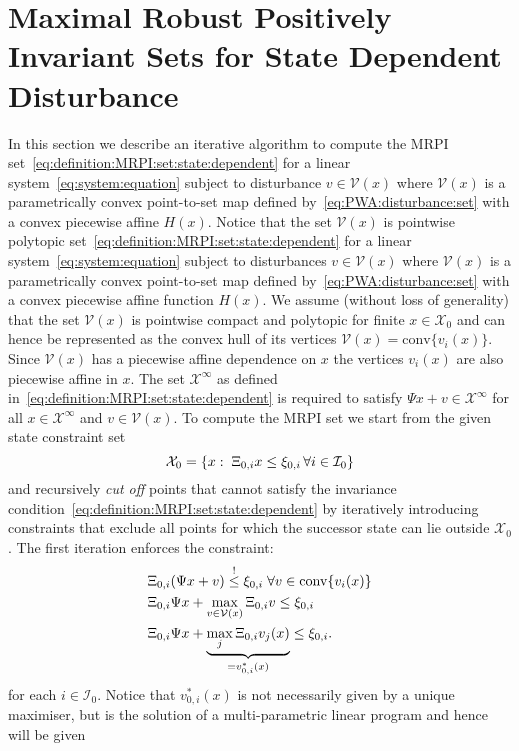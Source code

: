 \documentclass[letterpaper, 10pt, conference]{ieeeconf} %
\providecommand{\conv}{\text{conv}}
\begin{document}
\section{Maximal Robust Positively Invariant Sets for State Dependent Disturbance}\label{sec:state:dep:MRPI}
In this section we describe an iterative algorithm to compute the MRPI set~\eqref{eq:definition:MRPI:set:state:dependent} 
for a linear system~\eqref{eq:system:equation} subject to disturbance
$v\in\mathcal V(x)$ where $\mathcal V(x)$ is a parametrically convex point-to-set map defined 
by~\eqref{eq:PWA:disturbance:set} with a convex piecewise affine $H(x)$.
Notice that the set $\mathcal V(x)$ is pointwise polytopic set~\eqref{eq:definition:MRPI:set:state:dependent} 
for a linear system~\eqref{eq:system:equation} subject to disturbances
$v\in\mathcal V(x)$ where $\mathcal V(x)$ is a parametrically convex point-to-set map defined 
by~\eqref{eq:PWA:disturbance:set} with a convex piecewise affine function $H(x)$.
We assume (without loss of generality) that the set $\mathcal V(x)$ is pointwise compact and polytopic 
for finite $x\in\mathcal X_0$ and can hence be represented as the 
convex hull of its vertices $\mathcal V(x) = \conv\{v_i(x)\}$. Since ${\mathcal{V}}(x)$
has a piecewise affine dependence on $x$ the vertices $v_i(x)$ are also piecewise affine in $x$.
The set $\mathcal X^\infty$ as defined in~\eqref{eq:definition:MRPI:set:state:dependent} 
is required to satisfy $\Psi x + v\in\mathcal X^\infty$ for all
$x\in\mathcal X^\infty$ and $v\in\mathcal V(x)$. To compute the MRPI set we start from the given 
state constraint set
\[
\mathcal X_0 = \{x:\;\Xi_{0,i}x\leq \xi_{0,i}\,\forall i\in\mathcal I_0\}
\]
and
recursively \emph{cut off} points that cannot satisfy the invariance condition~\eqref{eq:definition:MRPI:set:state:dependent}
by iteratively introducing constraints that exclude all points for which the successor state can lie outside 
$\mathcal X_0$. The first iteration enforces the constraint:
%
\[
\begin{split}
	&\genmat_{0,i}(\Psi x + v)\overset{!}{\leq}\genvec_{0,i}\;\forall v\in\conv\{v_i(x)\}\\
	&\genmat_{0,i}\Psi x + \max_{v\in\mathcal V(x)} \genmat_{0,i} v \leq \genvec_{0,i}\\
	&\genmat_{0,i}\Psi x + \underbrace{\max_{j} \genmat_{0,i} v_j(x)}_{=v_{0,i}^\ast(x)} \leq \genvec_{0,i}.
\end{split}
\]
%
for each $i\in \mathcal I_0$.
Notice that $v_{0,i}^\ast(x)$ is not necessarily given by a unique maximiser, 
but is the solution of a multi-parametric linear program and hence will be given 
\end{document}
